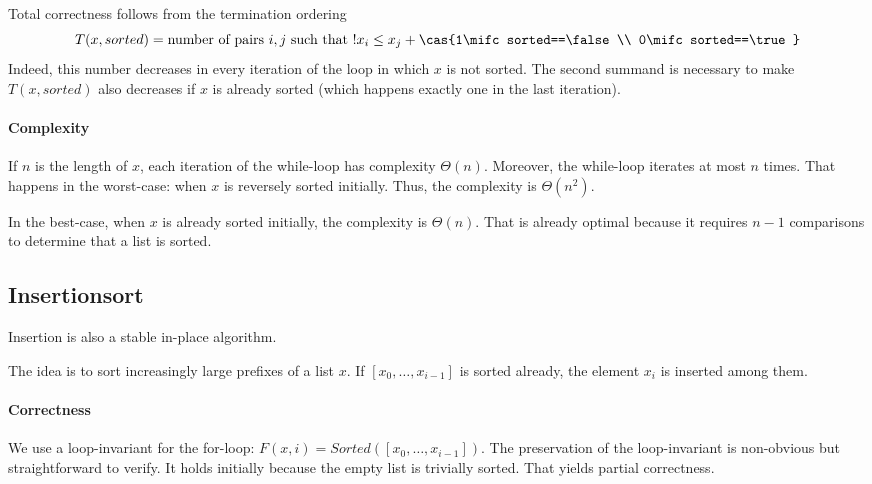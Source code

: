 Total correctness follows from the termination ordering
 \[T(x,sorted)=\text{number of pairs $i,j$ such that $! x_i\leq x_j$} + \cas{1\mifc sorted==\false\\ 0\mifc sorted==\true}\]
Indeed, this number decreases in every iteration of the loop in which $x$ is not sorted.
The second summand is necessary to make $T(x,sorted)$ also decreases if $x$ is already sorted (which happens exactly one in the last iteration).

\paragraph{Complexity}
If $n$ is the length of $x$, each iteration of the while-loop has complexity $\Theta(n)$.
Moreover, the while-loop iterates at most $n$ times.
That happens in the worst-case: when $x$ is reversely sorted initially.
Thus, the complexity is $\Theta(n^2)$.

In the best-case, when $x$ is already sorted initially, the complexity is $\Theta(n)$.
That is already optimal because it requires $n-1$ comparisons to determine that a list is sorted.

\subsection{Insertionsort}\label{sec:ad:sort:insertion}

Insertion is also a stable in-place algorithm.

The idea is to sort increasingly large prefixes of a list $x$.
If $[x_0,\ldots,x_{i-1}]$ is sorted already, the element $x_i$ is inserted among them.

\begin{acode}
\end{acode}

\paragraph{Correctness}
We use a loop-invariant for the for-loop: $F(x,i)=Sorted([x_0,\ldots,x_{i-1}])$.
The preservation of the loop-invariant is non-obvious but straightforward to verify.
It holds initially because the empty list is trivially sorted.
That yields partial correctness.

